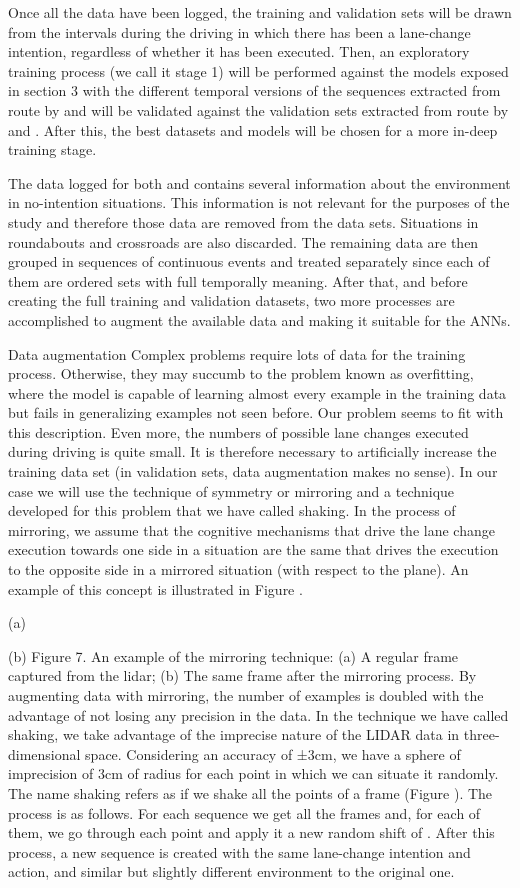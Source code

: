 {Once all the data have been logged, the training and validation sets will be drawn from the intervals during the driving in which there has been a lane-change intention, regardless of whether it has been executed. Then, an exploratory training process (we call it stage 1) will be performed against the models exposed in section 3 with the different temporal versions of the sequences extracted from route  by  and will be validated against the validation sets extracted from route  by  and . After this, the best datasets and models will be chosen for a more in-deep training stage.


The data logged for both  and  contains several information about the environment in no-intention situations. This information is not relevant for the purposes of the study and therefore those data are removed from the data sets. Situations in roundabouts and crossroads are also discarded. The remaining data are then grouped in sequences of continuous events and treated separately since each of them are ordered sets with full temporally meaning.
After that, and before creating the full training and validation datasets, two more processes are accomplished to augment the available data and making it suitable for the ANNs.


Data augmentation
Complex problems require lots of data for the training process. Otherwise, they may succumb to the problem known as overfitting, where the model is capable of learning almost every example in the training data but fails in generalizing examples not seen before.
Our problem seems to fit with this description. Even more, the numbers of possible lane changes executed during driving is quite small. It is therefore necessary to artificially increase the training data set (in validation sets, data augmentation makes no sense). In our case we will use the technique of symmetry or mirroring and a technique developed for this problem that we have called shaking.
In the process of mirroring, we assume that the cognitive mechanisms that drive the lane change execution towards one side in a situation are the same that drives the execution to the opposite side in a mirrored situation (with respect to the  plane). An example of this concept is illustrated in Figure .

(a)

(b)
Figure 7. An example of the mirroring technique: (a) A regular frame captured from the lidar; (b) The same frame after the mirroring process.
By augmenting data with mirroring, the number of examples is doubled with the advantage of not losing any precision in the data.
In the technique we have called shaking, we take advantage of the imprecise nature of the LIDAR data in three-dimensional space. Considering an accuracy of ±3cm, we have a sphere of imprecision of 3cm of radius for each point in which we can situate it randomly. The name shaking refers as if we shake all the points of a frame (Figure ).
The process is as follows. For each sequence we get all the frames and, for each of them, we go through each point and apply it a new random shift of . After this process, a new sequence is created with the same lane-change intention and action, and similar but slightly different environment to the original one.

}
